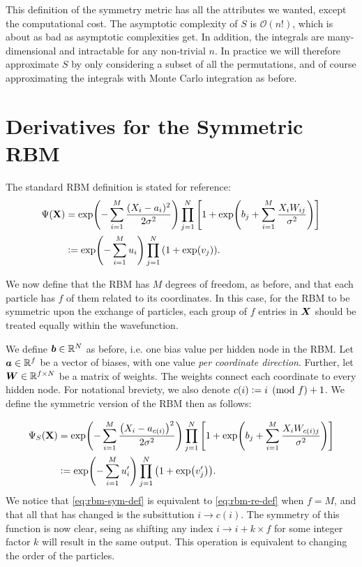 \documentclass[Thesis.tex]{subfiles}
\begin{document}
This definition of the symmetry metric has all the attributes we wanted, except
the computational cost. The asymptotic complexity of $S$ is $\mathcal{O}(n!)$,
which is about as bad as asymptotic complexities get. In addition, the integrals
are many-dimensional and intractable for any non-trivial $n$. In practice we
will therefore approximate $S$ by only considering a subset of all the permutations, and of course approximating the integrals with Monte Carlo integration as before.

\section{Derivatives for the Symmetric RBM}

The standard RBM definition is stated for reference:
\begin{align}\label{eq:rbm-re-def}
    \Psi(\mathbf{X}) &= \exp(-\sum_{i=1}^M \frac{(X_i - a_i)^2}{2\sigma^2} )
                        \prod_{j=1}^N\qty[1 + \exp(b_j + \sum_{i=1}^M \frac{X_i
                        W_{ij}}{\sigma^2})]\\
    &\vcentcolon= \exp(-\sum_{i=1}^Mu_i)\prod_{j=1}^N\qty(1 + \exp(v_j)).
\end{align}

We now define that the RBM has $M$ degrees of freedom, as before, and that each
particle has $f$ of them related to its coordinates. In this case, for the RBM
to be symmetric upon the exchange of particles, each group of $f$ entries in
$\bm{X}$ should be treated equally within the wavefunction.

We define $\bm{b}\in \mathbb{R}^{N}$ as before, i.e. one bias value per hidden
node in the RBM. Let $\bm{a}\in \mathbb{R}^{f}$ be a vector of biases, with one
value \emph{per coordinate direction}. Further, let $\bm{W}\in \mathbb{R}^{f
\times N}$ be a matrix of weights. The weights connect each coordinate to every
hidden node. For notational breviety, we also denote $c(i) \vcentcolon= i \pmod{f} + 1$. We
define the symmetric version of the RBM then as follows:

\begin{align}\label{eq:rbm-sym-def}
    \Psi_S(\mathbf{X}) &=\exp(-\sum_{i=1}^M \frac{\qty(X_i - a_{c(i)})^2}{2\sigma^2} )
                        \prod_{j=1}^N\qty[1 + \exp(b_j + \sum_{i=1}^M \frac{X_i
                        W_{c(i)j}}{\sigma^2})]\\
    &\vcentcolon= \exp(-\sum_{i=1}^Mu_i')\prod_{j=1}^N\qty(1 + \exp(v_j')).
\end{align}
We notice that \autoref{eq:rbm-sym-def} is equivalent to \autoref{eq:rbm-re-def}
when $f=M$, and that all that has changed is the subsittution $i\rightarrow
c(i)$. The symmetry of this function is now clear, seing as shifting any index
$i\rightarrow i + k\times f$ for some integer factor $k$ will result in the same
output. This operation is equivalent to changing the order of the particles.
\end{document}
